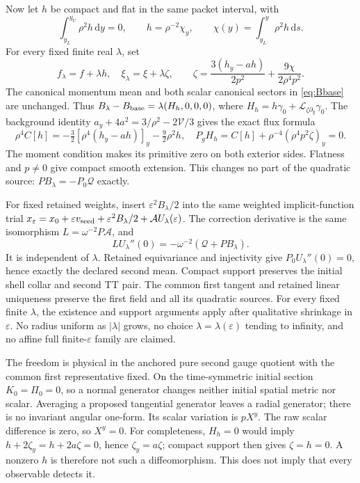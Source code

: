 \documentclass[11pt]{article}
\newcommand{\eps}{\varepsilon}
\newcommand{\dd}{\mathrm d}
\newcommand{\Lie}{\mathcal L}
\newcommand{\cV}{\mathcal V}
\begin{document}
Now let $h$ be compact and flat in the same packet interval, with
\begin{equation}
 \int_{y_L}^{y_U}\rho^2h\,\dd y=0,\qquad
 h=\rho^{-2}\chi_y,\qquad
 \chi(y)=\int_{y_L}^y\rho^2h\,\dd s. \label{eq:moment}
\end{equation}
For every fixed finite real $\lambda$, set
\begin{equation}
 f_\lambda=f+\lambda h,\quad
 \xi_\lambda=\xi+\lambda\zeta,\qquad
 \zeta=\frac{3(h_y-ah)}{2p^2}+\frac{9\chi}{2\rho^4p^2}.
 \label{eq:zeta}
\end{equation}
The canonical momentum mean and both scalar canonical sectors in
\eqref{eq:Bbase} are unchanged. Thus
$B_\lambda-B_{\rm base}=\lambda(H_h,0,0,0)$, where
$H_h=h\gamma_0+\Lie_{\zeta\partial_y}\gamma_0$.
The background identity
$a_y+4a^2=3/\rho^2-2\cV/3$ gives the exact flux formula
\begin{equation}
 \rho^4C[h]=-\tfrac32[\rho^4(h_y-ah)]_y-\tfrac92\rho^2h,
 \quad
 P_gH_h=C[h]+\rho^{-4}(\rho^4p^2\zeta)_y=0. \label{eq:flux}
\end{equation}
The moment condition makes its primitive zero on both exterior sides.
Flatness and $p\ne0$ give compact smooth extension. This changes no part
of the quadratic source: $PB_\lambda=-P_0\mathcal Q$ exactly.

For fixed retained weights, insert $\eps^2B_\lambda/2$ into the same
weighted implicit-function trial
$x_\eps=x_0+\eps v_{\rm seed}+\eps^2B_\lambda/2+\mathcal A U_\lambda(\eps)$.
The correction derivative is the same isomorphism
$L=\omega^{-2}P\mathcal A$, and
\begin{equation}
 LU_\lambda''(0)=-\omega^{-2}(\mathcal Q+PB_\lambda).
 \label{eq:ift}
\end{equation}
It is independent of $\lambda$. Retained equivariance and injectivity
give $P_0U_\lambda''(0)=0$, hence exactly the declared second mean.
Compact support preserves the initial shell collar and second TT pair.
The common first tangent and retained linear uniqueness preserve the first
field and all its quadratic sources. For every fixed finite $\lambda$,
the existence and support arguments apply after qualitative shrinkage in
$\eps$. No radius uniform as $|\lambda|$ grows, no choice
$\lambda=\lambda(\eps)$ tending to infinity, and no affine full
finite-$\eps$ family are claimed.

The freedom is physical in the anchored pure second gauge quotient with
the common first representative fixed. On the time-symmetric initial
section $K_0=\Pi_0=0$, so a normal generator changes neither initial
spatial metric nor scalar. Averaging a proposed tangential generator leaves
a radial generator; there is no invariant angular one-form. Its scalar
variation is $pX^y$. The raw scalar difference is zero, so $X^y=0$.
For completeness, $H_h=0$ would imply
$h+2\zeta_y=h+2a\zeta=0$, hence $\zeta_y=a\zeta$; compact support then
gives $\zeta=h=0$. A nonzero $h$ is therefore not such a diffeomorphism.
This does not imply that every observable detects it.
\end{document}
